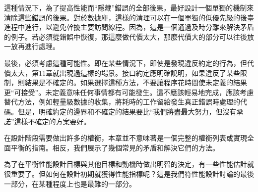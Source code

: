 這種情況下，為了提高性能而“隱藏”錯誤的全部後果，最好設計一個單獨的機制來清除這些錯誤的後果。對於數據庫，這樣的清理可以在一個單獨的低優先級的後臺進程中進行，以避免幹擾主要訪問線程。因為，這是一個通過及時分離來解決矛盾的例子。若必須從錯誤中恢復，那這麼做代價太大，那麼代價大的部分可以往後放一放再進行處理。

最後，必須考慮這種可能性。即在某些情況下，即使是發現違反約定的行為，但代價太大，第11章就出現過這樣的場景。接口約定應明確說明，如果違反了某些限制，則結果是不確定的。如果選擇這種方法，不要讓程序花時間使未定義的結果更“可接受”。未定義意味任何事情都有可能發生。這不應該輕易地完成，應該考慮替代方法，例如輕量級數據的收集，將耗時的工作留給發生真正錯誤時處理的代碼。但是，明確約定的邊界和不確定的結果要比“我們將盡最大努力，但沒有承諾”這樣不確定的方案要好。 

在設計階段需要做出許多的權衡，本章並不意味著是一個完整的權衡列表或實現全面平衡的指南。相反，我們展示了幾個常見的矛盾和解決它們的方法。 

為了在平衡性能設計目標與其他目標和動機時做出明智的決定，有一些性能估計就很重要了。但如何在設計初期就獲得性能指標呢？這是我們符性能設計討論的最後一部分，在某種程度上也是最難的一部分。














